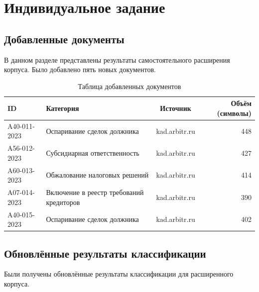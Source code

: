 \documentclass[12pt, a4paper]{report}
\begin{document}
\chapter{Индивидуальное задание}

\section{Добавленные документы}

В данном разделе представлены результаты самостоятельного расширения корпуса.
Было добавлено пять новых документов.

\begin{table}[h]
  \centering
  \caption{Таблица добавленных документов}
  \label{tab:new_documents}
  \begin{tabularx}{\textwidth}{l X c r}
    \toprule
    \rowcolor{LightBlue}
    \textsf{\textbf{ID}} &
    \textsf{\textbf{Категория}} &
    \textsf{\textbf{Источник}} &
    \textsf{\textbf{Объём (символы)}} \\
    \midrule
    A40-011-2023 & Оспаривание сделок должника & kad.arbitr.ru & 448 \\
    A56-012-2023 & Субсидиарная ответственность & kad.arbitr.ru & 427 \\
    A60-013-2023 & Обжалование налоговых решений & kad.arbitr.ru & 414 \\
    A07-014-2023 & Включение в реестр требований кредиторов & kad.arbitr.ru & 390 \\
    A40-015-2023 & Оспаривание сделок должника & kad.arbitr.ru & 402 \\
    \bottomrule
  \end{tabularx}
\end{table}

\section{Обновлённые результаты классификации}

Были получены обновлённые результаты классификации для расширенного корпуса.
\end{document}
